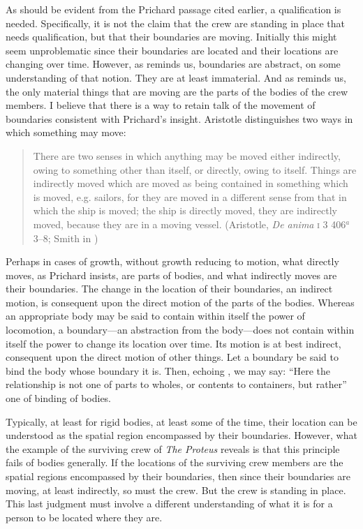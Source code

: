 As should be evident from the Prichard passage cited earlier, a qualification is needed. Specifically, it is not the claim that the crew are standing in place that needs qualification, but that their boundaries are moving. Initially this might seem unproblematic since their boundaries are located and their locations are changing over time. However, as \citet[103--4]{Derrida:2005aa} reminds us, boundaries are abstract, on some understanding of that notion. They are at least immaterial. And as \citet{Prichard:1950kx} reminds us, the only material things that are moving are the parts of the bodies of the crew members. I believe that there is a way to retain talk of the movement of boundaries consistent with Prichard's insight. Aristotle distinguishes two ways in which something may move: 
\begin{quote}
	There are two senses in which anything may be moved either indirectly, owing to something other than itself, or directly, owing to itself. Things are indirectly moved which are moved as being contained in something which is moved, e.g. sailors, for they are moved in a different sense from that in which the ship is moved; the ship is directly moved, they are indirectly moved, because they are in a moving vessel. (Aristotle, \emph{De anima} \textsc{i} 3 406\( ^{a} \)3--8; Smith in \citealt[9]{Barnes:1984uq})
\end{quote} 
Perhaps in cases of growth, without growth reducing to motion, what directly moves, as Prichard insists, are parts of bodies, and what indirectly moves are their boundaries. The change in the location of their boundaries, an indirect motion, is consequent upon the direct motion of the parts of the bodies. Whereas an appropriate body may be said to contain within itself the power of locomotion, a boundary---an abstraction from the body---does not contain within itself the power to change its location over time. Its motion is at best indirect, consequent upon the direct motion of other things. Let a boundary be said to bind the body whose boundary it is. Then, echoing \citet[174]{Witt:1995kx}, we may say: ``Here the relationship is not one of parts to wholes, or contents to containers, but rather'' one of binding of bodies.

Typically, at least for rigid bodies, at least some of the time, their location can be understood as the spatial region encompassed by their boundaries. However, what the example of the surviving crew of \emph{The Proteus} reveals is that this principle fails of bodies generally. If the locations of the surviving crew members are the spatial regions encompassed by their boundaries, then since their boundaries are moving, at least indirectly, so must the crew. But the crew is standing in place. This last judgment must involve a different understanding of what it is for a person to be located where they are.

